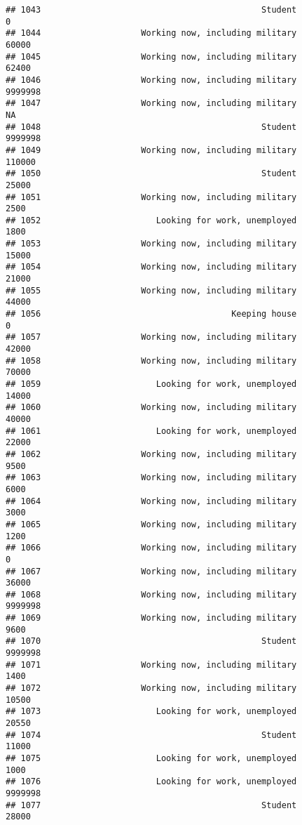 \documentclass[]{book}
\theoremstyle{definition}
\theoremstyle{definition}
\theoremstyle{remark}
\begin{document}
\begin{verbatim}
## 1043                                            Student               0
## 1044                    Working now, including military           60000
## 1045                    Working now, including military           62400
## 1046                    Working now, including military         9999998
## 1047                    Working now, including military              NA
## 1048                                            Student         9999998
## 1049                    Working now, including military          110000
## 1050                                            Student           25000
## 1051                    Working now, including military            2500
## 1052                       Looking for work, unemployed            1800
## 1053                    Working now, including military           15000
## 1054                    Working now, including military           21000
## 1055                    Working now, including military           44000
## 1056                                      Keeping house               0
## 1057                    Working now, including military           42000
## 1058                    Working now, including military           70000
## 1059                       Looking for work, unemployed           14000
## 1060                    Working now, including military           40000
## 1061                       Looking for work, unemployed           22000
## 1062                    Working now, including military            9500
## 1063                    Working now, including military            6000
## 1064                    Working now, including military            3000
## 1065                    Working now, including military            1200
## 1066                    Working now, including military               0
## 1067                    Working now, including military           36000
## 1068                    Working now, including military         9999998
## 1069                    Working now, including military            9600
## 1070                                            Student         9999998
## 1071                    Working now, including military            1400
## 1072                    Working now, including military           10500
## 1073                       Looking for work, unemployed           20550
## 1074                                            Student           11000
## 1075                       Looking for work, unemployed            1000
## 1076                       Looking for work, unemployed         9999998
## 1077                                            Student           28000

\end{verbatim}
\end{document}
